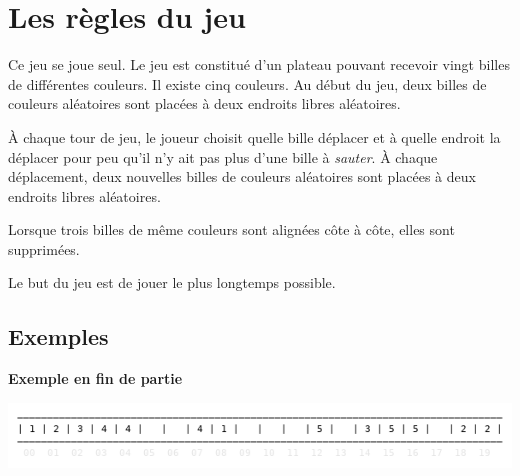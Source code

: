 \documentclass[a4paper,11pt]{style-esi/td}
\begin{document}

\section*{Les règles du jeu}


	Ce jeu se joue seul. Le jeu est constitué d'un plateau pouvant recevoir
	vingt billes de différentes couleurs. Il existe cinq couleurs. Au début du
	jeu, deux billes de couleurs aléatoires sont placées à deux endroits libres
	aléatoires. 
			
	À chaque tour de jeu, le joueur choisit quelle bille déplacer et
	à quelle endroit la déplacer pour peu qu'il n'y ait pas plus d'une
	bille à \textit{sauter}. À chaque déplacement, deux nouvelles billes de
	couleurs aléatoires sont placées à deux endroits libres aléatoires.

	Lorsque trois billes de même couleurs sont alignées côte à côte, elles
	sont supprimées. 

	Le but du jeu est de jouer le plus longtemps possible. 

\bigskip
\bigskip
\subsection*{Exemples}

\textbf{Exemple en fin de partie}

\includegraphics[width=.9\linewidth]{img/out-3.png}
\end{document}
